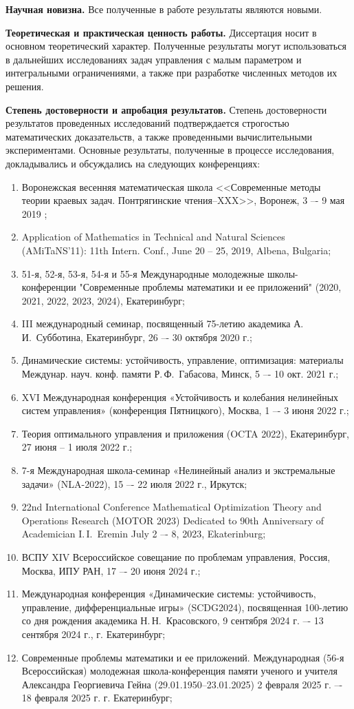 \documentclass[../main.tex]{subfiles}
\begin{document}
\textbf{Научная новизна.} Все полученные в работе результаты являются новыми.

\textbf{Теоретическая и практическая ценность работы.} Диссертация носит в основном теоретический характер.
Полученные результаты могут использоваться в дальнейших исследованиях задач управления с малым параметром и интегральными ограничениями, а также при разработке численных методов их решения.

\textbf{Степень достоверности и апробация результатов.} Степень достоверности результатов проведенных исследований подтверждается строгостью математических доказательств, а также проведенными вычислительными экспериментами.
Основные результаты, полученные в процессе исследования, докладывались и обсуждались на следующих конференциях:
\begin{enumerate}
	\item Воронежская весенняя математическая школа <<Современные методы теории краевых задач. Понтрягинские чтения–XXX>>, Воронеж, 3 –- 9 мая 2019 ;
	\item Application of Mathematics in Technical and Natural Sciences (AMiTaNS'11): 11th Intern. Conf., June 20 – 25, 2019, Albena, Bulgaria;
	\item 51-я, 52-я, 53-я, 54-я и 55-я Международные молодежные школы-конференции "Современные проблемы математики и ее приложений" (2020, 2021, 2022, 2023, 2024), Екатеринбург;
	\item III международный семинар, посвященный 75-летию академика А.\,И.~Субботина, Екатеринбург, 26 –- 30 октября 2020 г.;
	\item Динамические системы: устойчивость, управление, оптимизация: материалы Междунар. науч. конф. памяти Р.\,Ф.~Габасова, Минск, 5 –- 10 окт. 2021 г.;
	\item XVI Международная конференция «Устойчивость и колебания нелинейных систем управления» (конференция Пятницкого), Москва, 1 –- 3 июня 2022 г.;
	\item Теория оптимального управления и приложения (OCTA 2022),
	Екатеринбург, 27 июня – 1 июля 2022 г.;
	\item 7-я Международная школа-семинар «Нелинейный анализ и экстремальные задачи» (NLA-2022), 15 –- 22 июля 2022 г., Иркутск;
	\item 22nd International Conference Mathematical Optimization Theory and Operations Research
	(MOTOR 2023) Dedicated to 90th Anniversary of Academician I.\,I.~Eremin July 2 –- 8, 2023, Ekaterinburg;
	\item ВСПУ XIV Всероссийское совещание по проблемам управления, Россия, Москва, ИПУ РАН, 17 –- 20 июня 2024 г.;
	\item Международная конференция «Динамические системы: устойчивость, управление, дифференциальные игры» (SCDG2024), посвященная 100-летию со дня рождения академика Н.\,Н.~Красовского, 9 сентября 2024 г. –- 13 сентября 2024 г., г. Екатеринбург;
	\item Современные проблемы математики и ее приложений. Международная (56-я Всероссийская) молодежная школа-конференция памяти ученого и учителя Александра Георгиевича Гейна (29.01.1950–23.01.2025) 2 февраля 2025 г. –- 18 февраля 2025 г.
	г. Екатеринбург;
\end{enumerate}
\end{document}
